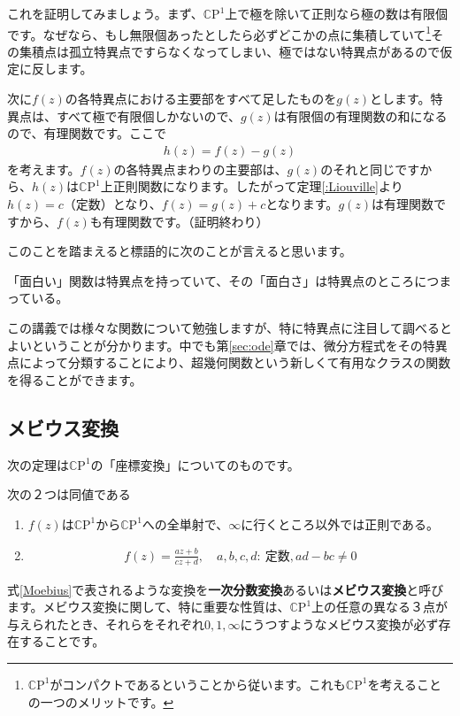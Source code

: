 \documentclass[report,paper=a4, fontsize=12pt, line_length=16cm, number_of_lines=33,dvipdfmx]{jlreq}
\newenvironment{myquote}{\begin{tcolorbox}[
  colback = blue!5, after = \noindent] }{\end{tcolorbox}}
\numberwithin{equation}{section}
\newcommand{\Cb}{\mathbb{C}}
\newcommand{\CP}{\Cb \mathrm{P}}
\newcommand{\strong}[1]{\textsf{\bfseries #1}}
\begin{document}
これを証明してみましょう。まず、$\CP^1$上で極を除いて正則なら極の数は有限個です。なぜなら、もし無限個あったとしたら必ずどこかの点に集積していて\footnote{$\CP^1$がコンパクトであるということから従います。これも$\CP^1$を考えることの一つのメリットです。}その集積点は孤立特異点ですらなくなってしまい、極ではない特異点があるので仮定に反します。

次に$f(z)$の各特異点における主要部をすべて足したものを$g(z)$とします。特異点は、すべて極で有限個しかないので、$g(z)$は有限個の有理関数の和になるので、有理関数です。ここで
\begin{align}
  h(z)=f(z)-g(z)
\end{align}
を考えます。$f(z)$の各特異点まわりの主要部は、$g(z)$のそれと同じですから、$h(z)$は$\CP^1$上正則関数になります。したがって定理\ref{:Liouville}より$h(z)=c$（定数）となり、$f(z)=g(z)+c$となります。$g(z)$は有理関数ですから、$f(z)$も有理関数です。（証明終わり）

このことを踏まえると標語的に次のことが言えると思います。
\begin{myquote}
「面白い」関数は特異点を持っていて、その「面白さ」は特異点のところにつまっている。
\end{myquote}
この講義では様々な関数について勉強しますが、特に特異点に注目して調べるとよいということが分かります。中でも第\ref{sec:ode}章では、微分方程式をその特異点によって分類することにより、超幾何関数という新しくて有用なクラスの関数を得ることができます。

\subsection{メビウス変換}
次の定理は$\CP^1$の「座標変換」についてのものです。
\begin{theor}{}{}
次の２つは同値である
\begin{enumerate}
  \item $f(z)$は$\CP^1$から$\CP^1$への全単射で、$\infty$に行くところ以外では正則である。
  \item 
\begin{align}
  f(z)=\frac{az+b}{cz+d},\quad a,b,c,d:\ \text{定数}, ad-bc\ne 0\label{Moebius}
\end{align}
\end{enumerate}
\end{theor}
式\eqref{Moebius}で表されるような変換を\strong{一次分数変換}あるいは\strong{メビウス変換}と呼びます。メビウス変換に関して、特に重要な性質は、$\CP^1$上の任意の異なる３点が与えられたとき、それらをそれぞれ$0,1,\infty$にうつすようなメビウス変換が必ず存在することです。
\end{document}
